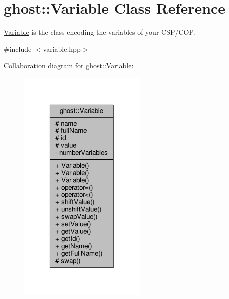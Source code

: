 \hypertarget{classghost_1_1Variable}{\section{ghost\-:\-:Variable Class Reference}
\label{classghost_1_1Variable}
}


\hyperlink{classghost_1_1Variable}{Variable} is the class encoding the variables of your C\-S\-P/\-C\-O\-P.  




{\ttfamily \#include $<$variable.\-hpp$>$}



Collaboration diagram for ghost\-:\-:Variable\-:\nopagebreak
\begin{figure}[H]
\begin{center}
\leavevmode
\includegraphics[width=174pt]{classghost_1_1Variable__coll__graph}
\end{center}
\end{figure}
